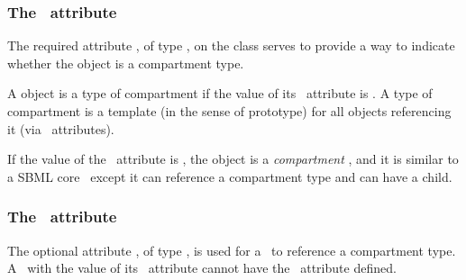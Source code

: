 \subsubsection{The \isTypeAtt\ attribute}
\label{def:Compartment:isType}

The required attribute \isTypeAtt, of type \booleanPT, on the  class serves to provide a way to indicate whether the  object is a compartment type. 

A  object is \mBlockChangedBegin{\revTwentyTwentyMarch} a type of compartment\mBlockChangedEnd{\revTwentyTwentyMarch} if the value of its \isTypeAtt\ attribute is . \mBlockChangedBegin{\revTwentyTwentyMarch} A type of compartment\mBlockChangedEnd{\revTwentyTwentyMarch} is a template (in the sense of prototype) for all  objects referencing it (via  \compartmentTypeAtt\ attributes). 


If the value of the \isTypeAtt\ attribute is ,\label{def:Compartment:isType:false} the  object is a  \textit{compartment} , and it is similar to a SBML core \compartment\ except it can reference a compartment type and can have a \ListOfCompartmentReferences child.

\subsubsection{The \compartmentTypeAtt\ attribute}
\label{def:Compartment:compartmentType}

The optional attribute \compartmentTypeAtt, of type \SIdRefPT, is used for a  \compartment\ to reference a compartment type. A \compartment\ with the  value of its \isTypeAtt\ attribute cannot have the \compartmentTypeAtt\ attribute defined.

\subsubsection{}
\label{def:ListOfCompartmentReferences}

